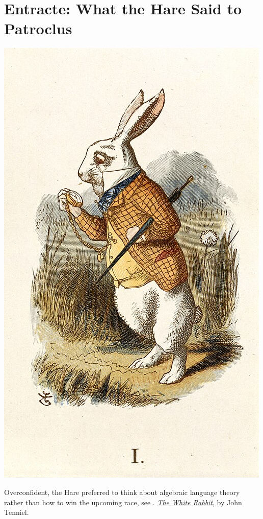 \chapter*{Entracte: What the Hare Said to Patroclus}
\renewcommand\thefigure{E.\arabic{figure}}
\setcounter{figure}{0}

\begin{marginfigure}[5.5cm]
	\centering
	\includegraphics[width=\linewidth]{fig/WhiteRabbit.jpg}
	\caption{
		Overconfident, the Hare preferred to think
		about algebraic language theory rather than how to win the upcoming race,
		see \cite{Carroll1895TortoiseAchilles}.
		\href{https://commons.wikimedia.org/wiki/File:The\_White\_Rabbit\_\%28Tenniel\%29\_-\_The\_Nursery\_Alice\_\%281890\%29\_-\_BL.jpg\#/media/File:Alice\_par\_John\_Tenniel\_02.svg}{\emph{The White Rabbit}}, by John Tenniel.
	}
\end{marginfigure}
